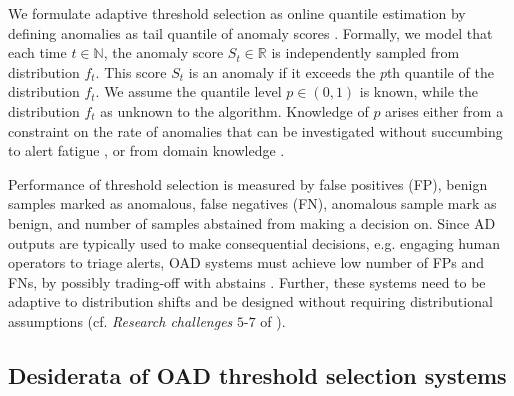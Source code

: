 
We formulate adaptive threshold selection as online quantile estimation by defining anomalies as tail quantile of anomaly scores \cite{steinwart2005classification, cadre2013estimation, gan2017scalable, siffer2017anomaly}. Formally, we model that each time $t \in \mathbb{N}$, the anomaly score $S_t \in \mathbb{R}$ is independently sampled from distribution $f_t$. This score $S_t$ is an {anomaly} if it exceeds the $p$th quantile of the distribution $f_t$. We assume the quantile level $p \in (0,1)$ is known, while the distribution $f_t$ as unknown to the algorithm. 
Knowledge of $p$ arises either from a constraint on the rate of anomalies that can be investigated without succumbing to alert fatigue \cite{hassan2019nodoze, ho2021hopper}, or from domain knowledge \cite{perini2023unsupervised}. 

Performance of threshold selection is measured by false positives (FP), benign samples marked as anomalous, false negatives (FN), anomalous sample mark as benign, and number of samples abstained from making a decision on. Since AD outputs are typically used to make consequential decisions, e.g. engaging human operators to triage alerts, OAD systems must achieve low number of FPs and FNs, by possibly trading-off with abstains \cite{ho2017detecting}. Further, these systems need to be adaptive to distribution shifts and be designed without requiring distributional assumptions (cf. \emph{Research challenges} $5$-$7$ of \cite{sadik2014research}).

 \subsection{Desiderata of OAD threshold selection systems}
 \label{sec:desiderata}


